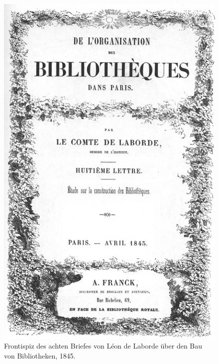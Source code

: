 \begin{figure}[htbp]
\centering
\includegraphics{img/wagner-2.jpg}
\caption{Frontispiz des achten Briefes von Léon de Laborde über
den Bau von Bibliotheken, 1845.}
\end{figure}

